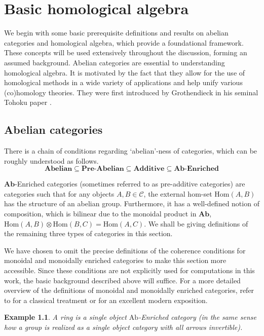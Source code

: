 \documentclass[12pt]{report}
\numberwithin{equation}{section}
\newcommand{\Hom}{{\mathrm{Hom}}}
\newtheorem{example}[dummy]{Example}
\begin{document}
	\chapter{Basic homological algebra}
	We begin with some basic prerequisite definitions and results on abelian categories and homological algebra, which provide a foundational framework. These concepts will be used extensively throughout the discussion, forming an assumed background.
	Abelian categories are essential to understanding homological algebra. It is motivated by the fact that they allow for the use of homological methods in a wide variety of applications and help unify various (co)homology theories. They were first introduced by Grothendieck in his seminal Tohoku paper \cite{grothendieck1957quelques}.
	
	\section{Abelian categories}
	There is a chain of conditions regarding `abelian'-ness of categories, which can be roughly understood as follows.
	\[ \textbf{Abelian} \subseteq \textbf{Pre-Abelian} \subseteq \textbf{Additive} \subseteq \textbf{Ab-Enriched}\]
	
	$\mathbf{Ab}$-Enriched categories  (sometimes referred to as pre-additive categories) are categories such that for any objects $A,B \in \mathcal{C}$, the external hom-set $\Hom(A,B)$ has the structure of an abelian group. Furthermore, it has a well-defined notion of composition, which is bilinear due to the monoidal product in $\mathbf{Ab}$, $\Hom(A,B)\otimes \Hom(B,C) =\Hom(A,C)$. We shall be giving definitions of the remaining three types of categories in this section.
	
	We have chosen to omit the precise definitions of the coherence conditions for monoidal and monoidally enriched categories to make this section more accessible. Since these conditions are not explicitly used for computations in this work, the basic background described above will suffice. For a more detailed overview of the definitions of monoidal and monoidally enriched categories, refer to \cite{lane1998categories} for a classical treatment or \cite{riehl2017category} for an excellent modern exposition.
	\begin{example}
		A ring is a single object $\mathrm{Ab}$-Enriched category (in the same sense how a group is realized as a single object category with all arrows invertible).
	\end{example}
	
\end{document}
